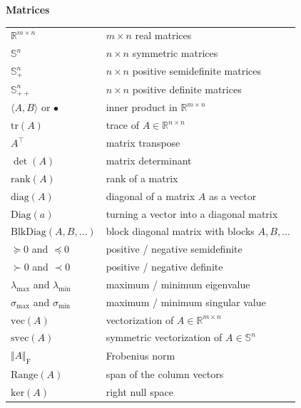 \documentclass[
]{book}
\theoremstyle{definition}
\theoremstyle{definition}
\theoremstyle{definition}
\theoremstyle{definition}
\theoremstyle{remark}
\begin{document}
\textbf{Matrices}

\begin{longtable}[]{@{}
  >{\raggedright\arraybackslash}p{}
  >{\raggedright\arraybackslash}p{}@{}}
\toprule\noalign{}
\endhead
\bottomrule\noalign{}
\endlastfoot
\(\mathbb{R}^{m \times n}\) & \(m \times n\) real matrices \\
\(\mathbb{S}^{n}\) & \(n\times n\) symmetric matrices \\
\(\mathbb{S}^{n}_{+}\) & \(n\times n\) positive semidefinite matrices \\
\(\mathbb{S}^{n}_{++}\) & \(n\times n\) positive definite matrices \\
\(\langle A, B \rangle\) or \(\bullet\) & inner product in \(\mathbb{R}^{m \times n}\) \\
\(\mathrm{tr}(A)\) & trace of \(A \in \mathbb{R}^{n \times n}\) \\
\(A^\top\) & matrix transpose \\
\(\det(A)\) & matrix determinant \\
\(\mathrm{rank}(A)\) & rank of a matrix \\
\(\mathrm{diag}(A)\) & diagonal of a matrix \(A\) as a vector \\
\(\mathrm{Diag}(a)\) & turning a vector into a diagonal matrix \\
\(\mathrm{BlkDiag}(A,B,\dots)\) & block diagonal matrix with blocks \(A,B,\dots\) \\
\(\succeq 0\) and \(\preceq 0\) & positive / negative semidefinite \\
\(\succ 0\) and \(\prec 0\) & positive / negative definite \\
\(\lambda_{\max}\) and \(\lambda_{\min}\) & maximum / minimum eigenvalue \\
\(\sigma_{\max}\) and \(\sigma_{\min}\) & maximum / minimum singular value \\
\(\mathrm{vec}(A)\) & vectorization of \(A \in \mathbb{R}^{m \times n}\) \\
\(\mathrm{svec}(A)\) & symmetric vectorization of \(A \in \mathbb{S}^{n}\) \\
\(\Vert A \Vert_\mathrm{F}\) & Frobenius norm \\
\(\mathrm{Range}(A)\) & span of the column vectors \\
\(\mathrm{ker}(A)\) & right null space \\
\end{longtable}
\end{document}
